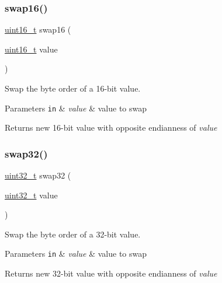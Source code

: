\subsubsection{\texorpdfstring{swap16()}{swap16()}}
{\footnotesize\ttfamily \hyperlink{group__hal__dos_ga5a8b2dc9e45a9ee81a94ef304fb62505}{uint16\+\_\+t} swap16 (\begin{DoxyParamCaption}\item[{\hyperlink{group__hal__dos_ga5a8b2dc9e45a9ee81a94ef304fb62505}{uint16\+\_\+t}}]{value }\end{DoxyParamCaption})}



Swap the byte order of a 16-\/bit value. 


\begin{DoxyParams}[1]{Parameters}
\mbox{\tt in}  & {\em value} & value to swap \\
\hline
\end{DoxyParams}
\begin{DoxyReturn}{Returns}
new 16-\/bit value with opposite endianness of {\itshape value} 
\end{DoxyReturn}
\mbox{\label{group__util__byteorder_ga5bdbc60a02db00841f567d1ade52f877}} 
\subsubsection{\texorpdfstring{swap32()}{swap32()}}
{\footnotesize\ttfamily \hyperlink{group__hal__dos_ga09a1e304d66d35dd47daffee9731edaa}{uint32\+\_\+t} swap32 (\begin{DoxyParamCaption}\item[{\hyperlink{group__hal__dos_ga09a1e304d66d35dd47daffee9731edaa}{uint32\+\_\+t}}]{value }\end{DoxyParamCaption})}



Swap the byte order of a 32-\/bit value. 


\begin{DoxyParams}[1]{Parameters}
\mbox{\tt in}  & {\em value} & value to swap \\
\hline
\end{DoxyParams}
\begin{DoxyReturn}{Returns}
new 32-\/bit value with opposite endianness of {\itshape value} 
\end{DoxyReturn}
